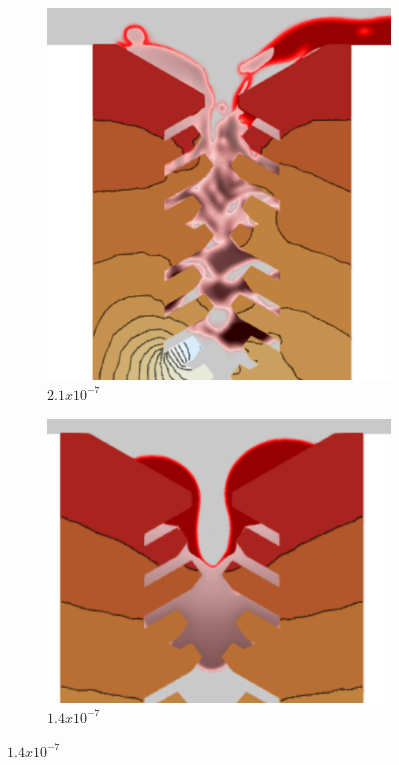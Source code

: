 \documentclass[conf]{new-aiaa}
\begin{document}
\begin{figure}[htp!]
    \begin{subfigure}{0.5\textwidth}
        \centering
        \includegraphics[scale=0.75]{Figures/coarsestMesh.png}
        \caption{$2.1x10^{-7}$}
        \label{fig:mesh-a}
    \end{subfigure}
    \begin{subfigure}{0.5\textwidth}
        \centering
        \includegraphics[scale=0.75]{Figures/fineMesh.png}
        \caption{$1.4x10^{-7}$}
        \label{fig:mesh-b}
    \end{subfigure}

\end{figure}
\end{document}
